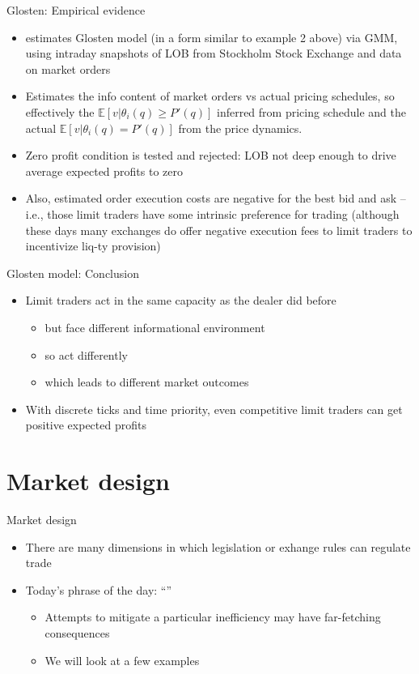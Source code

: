 \documentclass[english,10pt
,aspectratio=169
]{beamer}
\begin{document}
\begin{frame}{Glosten: Empirical evidence}
	\begin{itemize}
		\item \textbf{\cite{sandas_adverse_2001}} estimates Glosten model (in a form similar to example 2 above) via GMM, using intraday snapshots of LOB from Stockholm Stock Exchange and data on market orders 
		\item Estimates the info content of market orders vs actual pricing schedules, so effectively the $\mathbb{E}[v|\theta_i(q) \geq P'(q)]$ inferred from pricing schedule and the actual $\mathbb{E}[v|\theta_i(q) = P'(q)]$ from the price dynamics.
		\item Zero profit condition is tested and rejected: LOB not deep enough to drive average expected profits to zero
		\item Also, estimated order execution costs are negative for the best bid and ask -- i.e., those limit traders have some intrinsic preference for trading (although these days many exchanges do offer negative execution fees to limit traders to incentivize liq-ty provision)
	\end{itemize}
\end{frame}


\begin{frame}{Glosten model: Conclusion}
\begin{itemize}
	\item Limit traders act in the same capacity as the dealer did before
	\begin{itemize}
		\item but face different \alert{informational environment}
		\item so act differently
		\item which leads to different market outcomes
	\end{itemize}
	\item With discrete ticks and time priority, even competitive limit traders can get positive expected profits
\end{itemize}
\end{frame}




\section{Market design}

\begin{frame}{Market design}
	\begin{itemize}
		\item There are many dimensions in which legislation or exhange rules can regulate trade
		\item Today's phrase of the day: ``''
		\begin{itemize}
			\item Attempts to mitigate a particular inefficiency may have far-fetching consequences
			\item We will look at a few examples
		\end{itemize}
	\end{itemize}
\end{frame}
\end{document}
